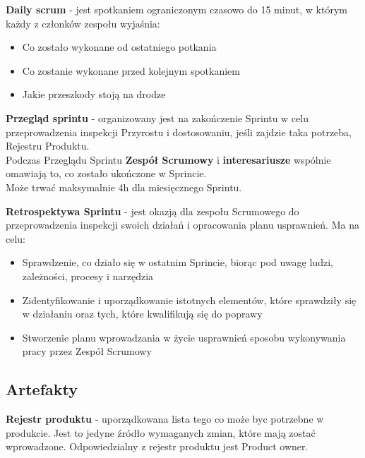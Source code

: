 \documentclass[12pt]{article}
\begin{document}
    \begin{definition}
    \textbf{Daily scrum} - jest spotkaniem ograniczonym czasowo do 15 minut, w którym każdy z członków zespołu wyjaśnia:
    \begin{itemize}
        \item Co zostało wykonane od ostatniego potkania
        \item Co zostanie wykonane przed kolejnym spotkaniem
        \item Jakie przeszkody stoją na drodze
    \end{itemize}
    \end{definition}
    
    \begin{definition}
    \textbf{Przegląd sprintu} -  organizowany jest na zakończenie Sprintu w celu przeprowadzenia inspekcji Przyrostu i dostosowaniu, jeśli zajdzie taka potrzeba, Rejestru Produktu. \\
    Podczas Przeglądu Sprintu \textbf{Zespół Scrumowy} i \textbf{interesariusze} wspólnie omawiają to, co zostało ukończone w Sprincie. \\
    Może trwać maksymalnie 4h dla miesięcznego Sprintu.
    \end{definition}
    
    \begin{definition}
    \textbf{Retrospektywa Sprintu} - jest okazją dla zespołu Scrumowego do przeprowadzenia inspekcji swoich działań i opracowania planu usprawnień. Ma na celu:
    \begin{itemize}
        \item Sprawdzenie, co działo się w ostatnim Sprincie, biorąc pod uwagę ludzi, zależności, procesy i narzędzia
        \item Zidentyfikowanie i uporządkowanie istotnych elementów, które sprawdziły się w działaniu oraz tych, które kwalifikują się do poprawy
        \item Stworzenie planu wprowadzania w życie usprawnień sposobu wykonywania pracy przez Zespół Scrumowy
    \end{itemize}
    \end{definition}
    
    \subsection{Artefakty}
    
    \begin{definition}
    \textbf{Rejestr produktu} - uporządkowana lista tego co może byc potrzebne w produkcie. Jest to jedyne źródło wymaganych zmian, które mają zostać wprowadzone.
    Odpowiedzialny z rejestr produktu jest Product owner.
    \end{definition}
    
\end{document}
